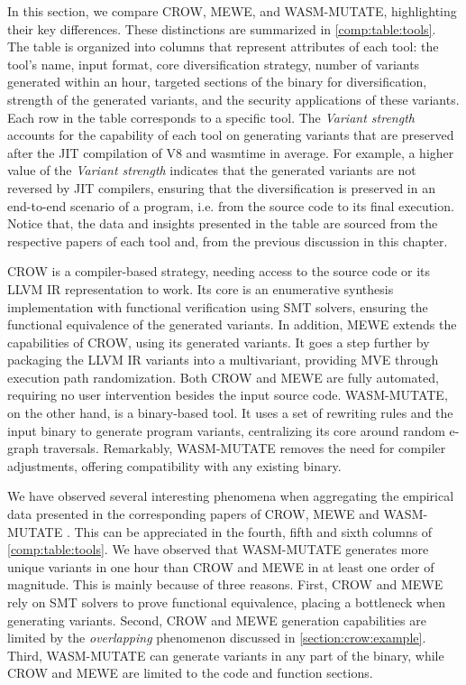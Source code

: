 
\label{discussion}

In this section, we compare CROW, MEWE, and WASM-MUTATE, highlighting their key differences. 
These distinctions are summarized in \autoref{comp:table:tools}. 
The table is organized into columns that represent attributes of each tool: the tool's name, input format, core diversification strategy, number of variants generated within an hour, targeted sections of the \Wasm binary for diversification, strength of the generated variants, and the security applications of these variants. 
Each row in the table corresponds to a specific tool. 
The \emph{Variant strength} accounts for the capability of each tool on generating variants that are preserved after the JIT compilation of V8 and wasmtime in average.
For example, a higher value of the \emph{Variant strength} indicates that the generated variants are not reversed by JIT compilers, ensuring that the diversification is preserved in an end-to-end scenario of a \Wasm program, i.e. from the source code to its final execution.
Notice that, the data and insights presented in the table are sourced from the respective papers of each tool and, from the previous discussion in this chapter.


CROW is a compiler-based strategy, needing access to the source code or its LLVM IR representation to work. 
Its core is an enumerative synthesis implementation with functional verification using SMT solvers, ensuring the functional equivalence of the generated variants.
In addition, MEWE extends the capabilities of CROW, using its generated variants. 
It goes a step further by packaging the LLVM IR variants into a  \Wasm multivariant, providing MVE through execution path randomization.
Both CROW and MEWE are fully automated, requiring no user intervention besides the input source code.
WASM-MUTATE, on the other hand, is a binary-based tool.
It uses a set of rewriting rules and the input \wasm binary to generate program variants, centralizing its core around random e-graph traversals. 
Remarkably, WASM-MUTATE removes the need for compiler adjustments, offering compatibility with any existing \Wasm binary. 


We have observed several interesting phenomena when aggregating the empirical data presented in the corresponding papers of CROW, MEWE and WASM-MUTATE \cite{CROW,MEWE, wasmmutate}. 
This can be appreciated in the fourth, fifth and sixth columns of \autoref{comp:table:tools}.
We have observed that WASM-MUTATE generates more unique variants in one hour than CROW and MEWE in at least one order of magnitude.
This is mainly because of three reasons.
First, CROW and MEWE rely on SMT solvers to prove functional equivalence, placing a bottleneck when generating variants.
Second, CROW and MEWE generation capabilities are limited by the \emph{overlapping} phenomenon discussed in \autoref{section:crow:example}.
Third, WASM-MUTATE can generate variants in any part of the \wasm binary, while CROW and MEWE are limited to the code and function sections.


